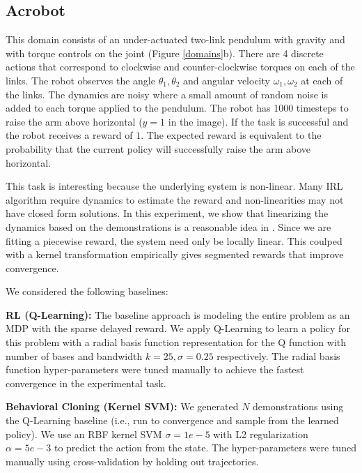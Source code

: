 \subsection{Acrobot}\label{exp:acrobot}
This domain consists of an under-actuated two-link pendulum with gravity and with torque controls on the joint (Figure \ref{domains}b). 
There are 4 discrete actions that correspond to clockwise and counter-clockwise torques on each of the links. 
The robot observes the angle $\theta_1, \theta_2$ and angular velocity $\omega_1, \omega_2$ at each of the links.
The dynamics are noisy where a small amount of random noise is added to each torque applied to the pendulum. 
The robot has 1000 timesteps to raise the arm above horizontal ($y=1$ in the image). If the task is successful and the robot receives a reward of $1$. 
The expected reward is equivalent to the probability that the current policy will successfully raise the arm above horizontal.

This task is interesting because the underlying system is non-linear. 
Many IRL algorithm require dynamics to estimate the reward and non-linearities may not have closed form solutions.
In this experiment, we show that linearizing the dynamics based on the demonstrations is a reasonable idea in \hirl.
Since we are fitting a piecewise reward, the system need only be locally linear.
This coulped with a kernel transformation empirically gives segmented rewards that improve convergence.

We considered the following baselines:

\vspace{0.25em}\noindent \textbf{RL (Q-Learning): } The baseline approach is modeling the entire problem as an MDP with the sparse delayed reward. We apply Q-Learning to learn a policy for this problem with a radial basis function representation for the Q function with number of bases and bandwidth $k=25, \sigma=0.25$ respectively. The radial basis function hyper-parameters were tuned manually to achieve the fastest convergence in the experimental task. 

\vspace{0.25em}\noindent \textbf{Behavioral Cloning (Kernel SVM): } We generated $N$ demonstrations using the Q-Learning baseline (i.e., run to convergence and sample from the learned policy). We use an RBF kernel SVM $\sigma=1e-5$  with L2 regularization $\alpha=5e-3$ to predict the action from the state. The hyper-parameters were tuned manually using cross-validation by holding out trajectories.

